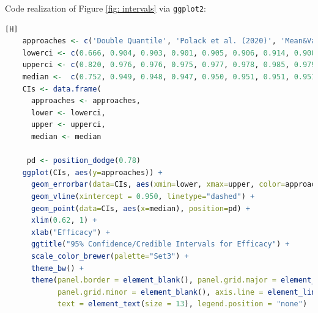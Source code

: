 \documentclass[12pt]{amsart}
\begin{document}
Code realization of Figure \ref{fig: intervals} via \texttt{ggplot2}:
\begin{lstlisting}[language=R][H]
    approaches <- c('Double Quantile', 'Polack et al. (2020)', 'Mean&Variance (var = 1/12)', 'Flat', 'Jeffreys', 'Likelihood Ratio', 'Wald', 'Clopper Pearson', 'Single Quantile&Variance')
    lowerci <- c(0.666, 0.904, 0.903, 0.901, 0.905, 0.906, 0.914, 0.900, 0.9059)
    upperci <- c(0.820, 0.976, 0.976, 0.975, 0.977, 0.978, 0.985, 0.979, 0.9775)
    median <-  c(0.752, 0.949, 0.948, 0.947, 0.950, 0.951, 0.951, 0.951, 0.9504)
    CIs <- data.frame(
      approaches <- approaches,
      lower <- lowerci,
      upper <- upperci,
      median <- median
      
     pd <- position_dodge(0.78)
    ggplot(CIs, aes(y=approaches)) +
      geom_errorbar(data=CIs, aes(xmin=lower, xmax=upper, color=approaches), width=.1, position=pd, size = 8) + 
      geom_vline(xintercept = 0.950, linetype="dashed") +
      geom_point(data=CIs, aes(x=median), position=pd) +
      xlim(0.62, 1) + 
      xlab("Efficacy") +
      ggtitle("95% Confidence/Credible Intervals for Efficacy") +
      scale_color_brewer(palette="Set3") +
      theme_bw() +
      theme(panel.border = element_blank(), panel.grid.major = element_blank(),
            panel.grid.minor = element_blank(), axis.line = element_line(colour = "black"), 
            text = element_text(size = 13), legend.position = "none") 
\end{lstlisting}

\doublespacing
\end{document}
